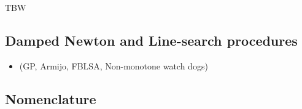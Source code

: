 \cite{Fukushima.ea2001}
\cite{Zhang.ea2009}
\cite{Hayashi.ea_SIOPT2005}




\begin{ndrva}
  TBW
\end{ndrva}



\subsection{Damped Newton and Line-search procedures}

\begin{itemize}
\item   (GP, Armijo, FBLSA, Non-monotone watch dogs)
\end{itemize}


\subsection{Nomenclature}

